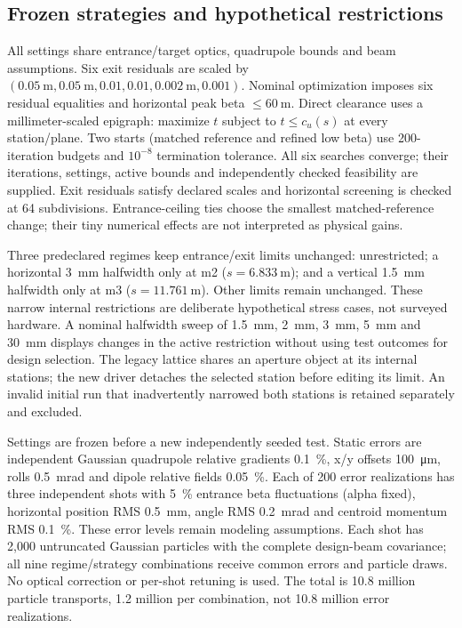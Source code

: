 \documentclass[10pt,a4paper]{article}
\begin{document}
\subsection{Frozen strategies and hypothetical restrictions}
All settings share entrance/target optics, quadrupole bounds and beam assumptions.
Six exit residuals are scaled by $(\SI{0.05}{\metre},\SI{0.05}{\metre},0.01,0.01,
\SI{0.002}{\metre},0.001)$. Nominal optimization imposes six residual equalities
and horizontal peak beta $\le\SI{60}{\metre}$. Direct clearance uses a millimeter-scaled
epigraph: maximize $t$ subject to $t\le c_u(s)$ at every station/plane.
Two starts (matched reference and refined low beta) use 200-iteration budgets and
$10^{-8}$ termination tolerance. All six searches converge; their iterations,
settings, active bounds and independently checked feasibility are supplied.
Exit residuals satisfy declared scales and horizontal screening is checked at
64 subdivisions. Entrance-ceiling ties choose the smallest matched-reference
change; their tiny numerical effects are not interpreted as physical gains.

Three predeclared regimes keep entrance/exit limits unchanged: unrestricted;
a horizontal \SI{3}{\milli\metre} halfwidth only at m2 ($s=\SI{6.833}{\metre}$); and a vertical \SI{1.5}{\milli\metre}
halfwidth only at m3 ($s=\SI{11.761}{\metre}$). Other limits remain unchanged. These narrow
internal restrictions are deliberate hypothetical stress cases, not surveyed
hardware. A nominal halfwidth sweep of \SI{1.5}{\milli\metre}, \SI{2}{\milli\metre}, \SI{3}{\milli\metre}, \SI{5}{\milli\metre} and \SI{30}{\milli\metre} displays changes
in the active restriction without using test outcomes for design selection.
The legacy lattice shares an aperture object at its internal stations; the new
driver detaches the selected station before editing its limit. An invalid initial
run that inadvertently narrowed both stations is retained separately and excluded.

Settings are frozen before a new independently seeded test. Static errors are
independent Gaussian quadrupole relative gradients \SI{0.1}{\percent}, x/y offsets \SI{100}{\micro\metre}, rolls \SI{0.5}{\milli\radian} and dipole relative fields \SI{0.05}{\percent}. Each of 200
error realizations has three independent shots with \SI{5}{\percent} entrance beta fluctuations
(alpha fixed), horizontal position RMS \SI{0.5}{\milli\metre}, angle RMS \SI{0.2}{\milli\radian} and centroid
momentum RMS \SI{0.1}{\percent}. These error levels remain modeling assumptions. Each shot has
2,000 untruncated Gaussian particles with the complete design-beam covariance;
all nine regime/strategy combinations receive common errors and particle draws.
No optical correction or per-shot retuning is used. The total is 10.8 million
particle transports, 1.2 million per combination, not 10.8 million error realizations.
\end{document}
